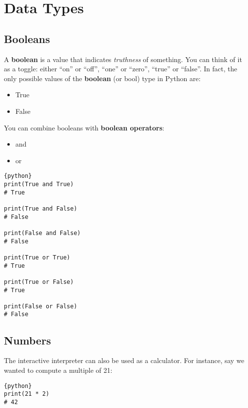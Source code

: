 \section{Data Types}\label{data-types}

\subsection{Booleans}\label{booleans}

A \textbf{boolean} is a value that indicates \emph{truthness} of
something. You can think of it as a toggle: either ``on'' or ``off'',
``one'' or ``zero'', ``true'' or ``false''. In fact, the only possible
values of the \textbf{boolean} (or bool) type in Python are:

\begin{itemize}

\item
  True
\item
  False
\end{itemize}

You can combine booleans with \textbf{boolean operators}:

\begin{itemize}

\item
  and
\item
  or
\end{itemize}

\begin{lstlisting}{python}
print(True and True)
# True

print(True and False)
# False

print(False and False)
# False

print(True or True)
# True

print(True or False)
# True

print(False or False)
# False
\end{lstlisting}

\subsection{Numbers}\label{numbers}

The interactive interpreter can also be used as a calculator. For
instance, say we wanted to compute a multiple of 21:

\begin{lstlisting}{python}
print(21 * 2)
# 42
\end{lstlisting}

